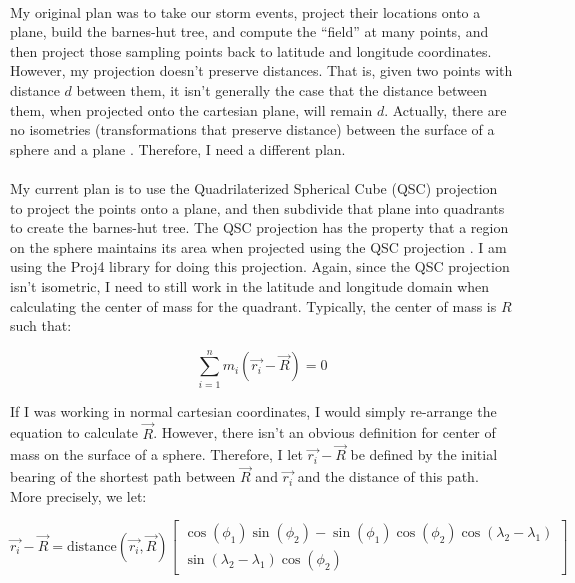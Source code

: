 \documentclass[a4paper]{article}
\begin{document}
\paragraph{} My original plan was to take our storm events, project their locations onto a plane, build the barnes-hut tree, and compute the ``field'' at many points, and then project those sampling points back to latitude and longitude coordinates. However, my projection doesn't preserve distances. That is, given two points with distance $d$ between them, it isn't generally the case that the distance between them, when projected onto the cartesian plane, will remain $d$. Actually, there are no isometries (transformations that preserve distance) between the surface of a sphere and a plane \cite{egregium}. Therefore, I need a different plan.


\paragraph{} My current plan is to use the Quadrilaterized Spherical Cube (QSC) projection to project the points onto a plane, and then subdivide that plane into quadrants to create the barnes-hut tree. The QSC projection has the property that a region on the sphere maintains its area when projected using the QSC projection \cite{qsc}. I am using the Proj4 library for doing this projection. Again, since the QSC projection isn't isometric, I need to still work in the latitude and longitude domain when calculating the center of mass for the quadrant. Typically, the center of mass is $R$ such that:

\begin{equation}
  \sum_{i = 1}^{n} m_{i}(\vec{r_{i}} - \vec{R}) = 0
\end{equation}

If I was working in normal cartesian coordinates, I would simply re-arrange the equation to calculate $\vec{R}$. However, there isn't an obvious definition for center of mass on the surface of a sphere. Therefore, I let $\vec{r_{i}} - \vec{R}$ be defined by the initial bearing of the shortest path between $\vec{R}$ and $\vec{r_{i}}$ and the distance of this path. More precisely, we let:

\begin{equation}
  \vec{r_{i}} - \vec{R} = \text{distance}(\vec{r_{i}}, \vec{R}) \begin{bmatrix}
    \cos(\phi_{1})\sin(\phi_{2}) - \sin(\phi_{1})\cos(\phi_{2})\cos(\lambda_{2} - \lambda_{1}) \\
    \sin(\lambda_{2} - \lambda_{1})\cos(\phi_{2})\end{bmatrix}
\end{equation}
\end{document}
